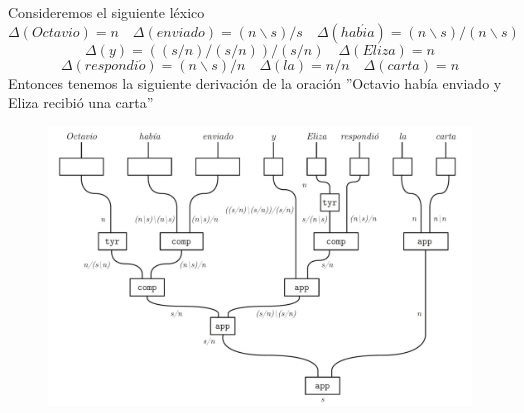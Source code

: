 \documentclass[../main.tex]{subfiles}
\begin{document}
	\begin{ej}
        Consideremos el siguiente léxico
		$$\Delta(Octavio)=n \quad \Delta(enviado)=(n \backslash s)/s \quad \Delta(hab\acute{i}a)=(n \backslash s) / (n \backslash s) $$
        $$\Delta(y)=((s/n)/(s/n))/(s/n) \quad \Delta(Eliza)=n$$
        $$\Delta(respondi\acute{o})=(n\backslash s)/n \quad \Delta(la)=n/n \quad \Delta(carta)=n$$
        Entonces tenemos la siguiente derivación de la oración ''Octavio había enviado y Eliza recibió una carta''
        \begin{figure}[H]		\includegraphics[scale=.45]{TeX/diagrama/4-3.pdf}
			\centering
		\end{figure}
	\end{ej}
	
\end{document}
